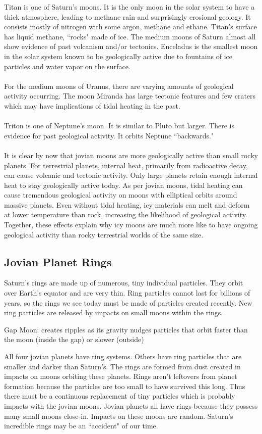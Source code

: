 \documentclass[12pt]{article}
\begin{document}
Titan is one of Saturn's moons. It is the only moon in the solar system to have a thick atmosphere, leading to methane rain and surprisingly erosional geology. It consists mostly of nitrogen with some argon, methane and ethane. Titan's surface has liquid methane, ``rocks" made of ice. The medium moons of Saturn almost all show evidence of past volcanism and/or tectonics. Enceladus is the smallest moon in the solar system known to be geologically active due to fountains of ice particles and water vapor on the surface. \\~\\
For the medium moons of Uranus, there are varying amounts of geological activity occurring. The moon Miranda has large tectonic features and few craters which may have implications of tidal heating in the past. \\~\\
Triton is one of Neptune's moon. It is similar to Pluto but larger. There is evidence for past geological activity. It orbits Neptune ``backwards." \\~\\
It is clear by now that jovian moons are more geologically active than small rocky planets. For terrestrial planets, internal heat, primarily from radioactive decay, can cause volcanic and tectonic activity. Only large planets retain enough internal heat to stay geologically active today. As per jovian moons, tidal heating can cause tremendous geological activity on moons with elliptical orbits around massive planets. Even without tidal heating, icy materials can melt and deform at lower temperature than rock, increasing the likelihood of geological activity. Together, these effects explain why icy moons are much more like to have ongoing geological activity than rocky terrestrial worlds of the same size. 

\subsection{Jovian Planet Rings} 
Saturn's rings are made up of numerous, tiny individual particles. They orbit over Earth's equator and are very thin. Ring particles cannot last for billions of years, so the rings we see today must be made of particles created recently. New ring particles are released by impacts on small moons within the rings. 
\begin{definition} Gap Moon: creates ripples as its gravity nudges particles that orbit faster than the moon (inside the gap) or slower (outside) \end{definition} 
All four jovian planets have ring systems. Others have ring particles that are smaller and darker than Saturn's. The rings are formed from dust created in impacts on moons orbiting these planets. Rings aren't leftovers from planet formation because the particles are too small to have survived this long. Thus there must be a continuous replacement of tiny particles which is probably impacts with the jovian moons. Jovian planets all have rings because they possess many small moons close-in. Impacts on these moons are random. Saturn's incredible rings may be an ``accident" of our time.
\end{document}
